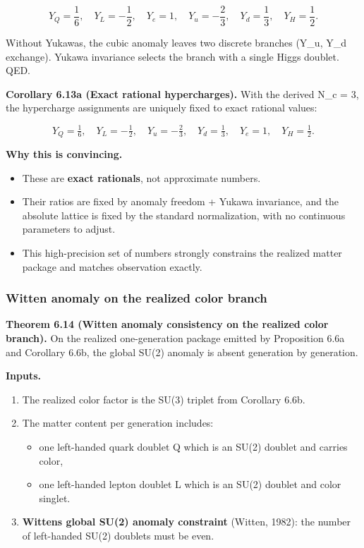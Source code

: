 \[
Y_Q = \frac{1}{6},\quad Y_L = -\frac{1}{2},\quad Y_e = 1,\quad
Y_u = -\frac{2}{3},\quad Y_d = \frac{1}{3},\quad Y_H = \frac{1}{2}.
\]

Without Yukawas, the cubic anomaly leaves two discrete branches (Y\_u, Y\_d exchange). Yukawa invariance selects the branch with a single Higgs doublet. QED.

\textbf{Corollary 6.13a (Exact rational hypercharges).} With the derived N\_c = 3, the hypercharge assignments are uniquely fixed to exact rational values:

\[
Y_Q = \tfrac{1}{6}, \quad
Y_L = -\tfrac{1}{2}, \quad
Y_u = -\tfrac{2}{3}, \quad
Y_d = \tfrac{1}{3}, \quad
Y_e = 1, \quad
Y_H = \tfrac{1}{2}.
\]

\textbf{Why this is convincing.}

\begin{itemize}
\tightlist
\item
  These are \textbf{exact rationals}, not approximate numbers.
\item
  Their ratios are fixed by anomaly freedom + Yukawa invariance, and the absolute lattice is fixed by the standard normalization, with no continuous parameters to adjust.
\item
  This high-precision set of numbers strongly constrains the realized matter package and matches observation exactly.
\end{itemize}

\subsubsection{Witten anomaly on the realized color branch}\label{69-witten-anomaly-and-the-number-of-colors}

\textbf{Theorem 6.14 (Witten anomaly consistency on the realized color branch).} On the realized one-generation package emitted by Proposition 6.6a and Corollary 6.6b, the global SU(2) anomaly is absent generation by generation.

\textbf{Inputs.}

\begin{enumerate}
\def\labelenumi{\arabic{enumi}.}
\tightlist
\item
  The realized color factor is the SU(3) triplet from Corollary 6.6b.
\item
  The matter content per generation includes:

  \begin{itemize}
  \tightlist
  \item
    one left-handed quark doublet Q which is an SU(2) doublet and carries color,
  \item
    one left-handed lepton doublet L which is an SU(2) doublet and color singlet.
  \end{itemize}
\item
  \textbf{Witten\textquotesingle s global SU(2) anomaly constraint} (Witten, 1982): the number of left-handed SU(2) doublets must be even.
\end{enumerate}

